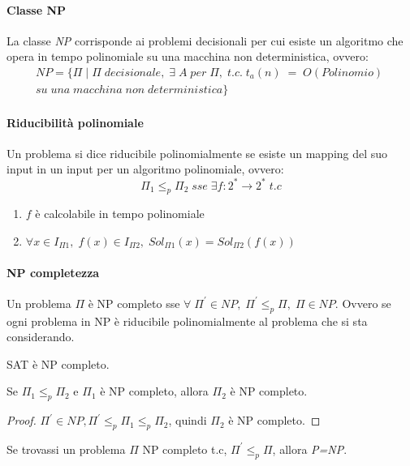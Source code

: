 \paragraph{Classe NP}
La classe \emph{NP} corrisponde ai problemi decisionali 
per cui esiste un algoritmo che opera
in tempo polinomiale su una macchina non deterministica, ovvero: 
\begin{equation}
    \begin{aligned}
        \mathit{NP} = \{\Pi\;|\;\Pi\;decisionale, \; \exists\;A\;per\;\Pi,\; t.c.\;t_a(n)\;=\;O(Polinomio)\;
        \\su\;una\;macchina\;non\;deterministica\}
    \end{aligned}
\end{equation}

\paragraph{Riducibilità polinomiale}
Un problema si dice riducibile polinomialmente se esiste un mapping del suo 
input in un input per un algoritmo polinomiale, ovvero:
$$\Pi_1 \leqslant _p \Pi_2 \;sse\; \exists f : 2^* \rightarrow 2^*\; t.c$$
\begin{enumerate}
    \item $f$ è calcolabile in tempo polinomiale
    \item $\forall x \in I_{\Pi1},\;f(x) \in I_{\Pi2},\; Sol_{\Pi1}(x) = Sol_{\Pi2}(f(x))$ 
\end{enumerate}

\paragraph{NP completezza}
Un problema $\Pi$ è NP completo sse $\forall\;\Pi^\prime \in NP,\; \Pi^\prime \leqslant _p \Pi, \; \Pi \in NP$.
Ovvero se ogni problema in NP è riducibile polinomialmente al problema che si sta 
considerando.

\begin{theorem}
    SAT è NP completo.
\end{theorem}
\begin{corollary}
    Se $\Pi_1 \leqslant _p \Pi_2$ e $\Pi_1$ è NP completo, allora $\Pi_2$ è NP completo.
\end{corollary}
\begin{proof}
    $\Pi^\prime \in NP, \Pi^\prime \leqslant _p \Pi_1 \leqslant _p \Pi_2$, quindi $\Pi_2$ è NP completo.
\end{proof}
\begin{remark}
    Se trovassi un problema $\Pi$ NP completo t.c, $\Pi^\prime \leqslant _p \Pi$, 
    allora \emph{P=NP}.
\end{remark}

